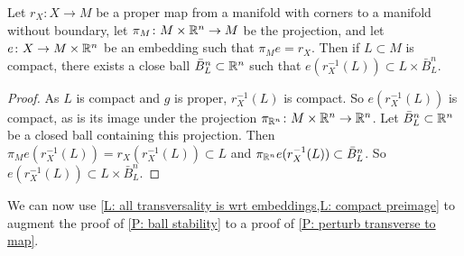 \begin{comment}
\end{comment}



\begin{lemma}\label{L: compact preimage}
	Let $r_X \colon X \to M$ be a proper map from a manifold with corners to a manifold without boundary, let $\pi_M \colon M \times \mathbb{R}^n \to M$ be the projection, and let $e \colon X \to M \times \mathbb{R}^n$ be an embedding such that $\pi_Me = r_X$.
	Then if $L \subset M$ is compact, there exists a close ball $\bar B^n_L \subset \mathbb{R}^n$ such that $e(r_X^{-1}(L)) \subset L \times \bar B^n_L$.
\end{lemma}

\begin{proof}
	As $L$ is compact and $g$ is proper, $r_X^{-1}(L)$ is compact.
	So $e(r_X^{-1}(L))$ is compact, as is its image under the projection $\pi_{\mathbb{R}^n} \colon M \times \mathbb{R}^n \to \mathbb{R}^n$.
	Let $\bar B^n_L \subset \mathbb{R}^n$ be a closed ball containing this projection.
	Then $\pi_Me(r_X^{-1}(L)) = r_X(r_X^{-1}(L)) \subset L$ and $\pi_{\mathbb{R}^n}e(r_X^{-1}(L)) \subset \bar B^n_L$.
	So $e(r_X^{-1}(L)) \subset L \times \bar B^n_L$.
\end{proof}

We can now use \cref{L: all transversality is wrt embeddings,L: compact preimage} to augment the proof of \cref{P: ball stability} to a proof of \cref{P: perturb transverse to map}.

